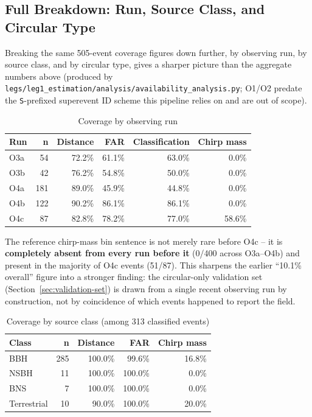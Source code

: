 \subsection{Full Breakdown: Run, Source Class, and Circular Type}
\label{sec:availability-breakdown}

Breaking the same 505-event coverage figures down further, by observing run, by source class, and by circular type, gives a sharper picture than the aggregate numbers above (produced by \texttt{legs/leg1\_estimation/analysis/availability\_analysis.py}; O1/O2 predate the \texttt{S}-prefixed superevent ID scheme this pipeline relies on and are out of scope).

\begin{table}[H]
\centering
\caption{Coverage by observing run}
\label{tab:availability-by-run}
\begin{tabular}{@{}lrrrrr@{}}
\toprule
Run & n & Distance & FAR & Classification & Chirp mass \\
\midrule
O3a & 54 & 72.2\% & 61.1\% & 63.0\% & 0.0\% \\
O3b & 42 & 76.2\% & 54.8\% & 50.0\% & 0.0\% \\
O4a & 181 & 89.0\% & 45.9\% & 44.8\% & 0.0\% \\
O4b & 122 & 90.2\% & 86.1\% & 86.1\% & 0.0\% \\
O4c & 87 & 82.8\% & 78.2\% & 77.0\% & 58.6\% \\
\bottomrule
\end{tabular}
\end{table}

The reference chirp-mass bin sentence is not merely rare before O4c -- it is \textbf{completely absent from every run before it} (0/400 across O3a--O4b) and present in the majority of O4c events (51/87). This sharpens the earlier ``10.1\% overall'' figure into a stronger finding: the circular-only validation set (Section~\ref{sec:validation-set}) is drawn from a single recent observing run by construction, not by coincidence of which events happened to report the field.

\begin{table}[H]
\centering
\caption{Coverage by source class (among 313 classified events)}
\label{tab:availability-by-class}
\begin{tabular}{@{}lrrrr@{}}
\toprule
Class & n & Distance & FAR & Chirp mass \\
\midrule
BBH & 285 & 100.0\% & 99.6\% & 16.8\% \\
NSBH & 11 & 100.0\% & 100.0\% & 0.0\% \\
BNS & 7 & 100.0\% & 100.0\% & 0.0\% \\
Terrestrial & 10 & 90.0\% & 100.0\% & 20.0\% \\
\bottomrule
\end{tabular}
\end{table}

